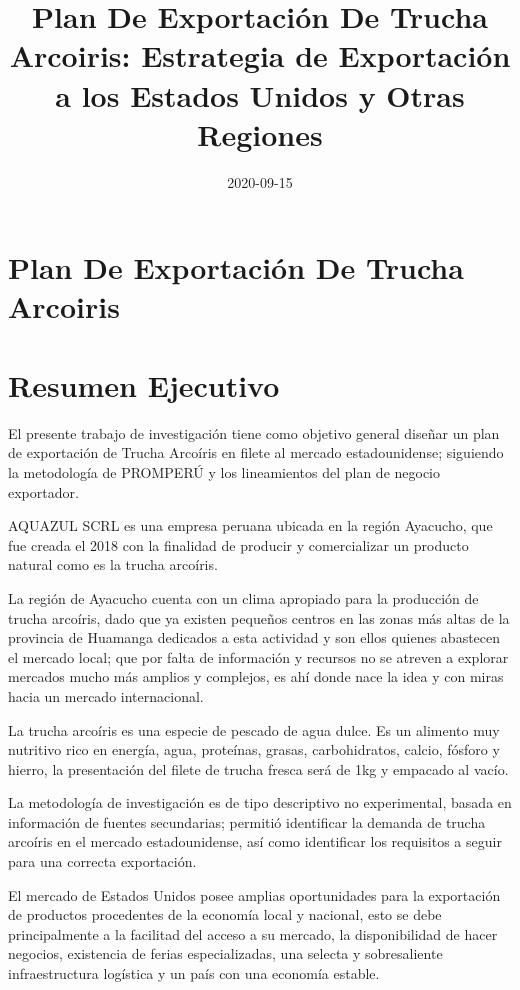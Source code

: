 \documentclass[
  stu,
  floatsintext,
  longtable,
  a4paper,
  nolmodern,
  notxfonts,
  notimes,
  colorlinks=true,linkcolor=blue,citecolor=blue,urlcolor=blue]{apa7}
\title{Plan De Exportación De Trucha Arcoiris: Estrategia de Exportación
a los Estados Unidos y Otras Regiones}
\date{2020-09-15}
\begin{document}
\maketitle

\hypertarget{toc}{}
\tableofcontents
\newpage
\section[Introduction]{Plan De Exportación De Trucha Arcoiris}

\setcounter{secnumdepth}{-\maxdimen} %

\setlength\LTleft{0pt}


\section{Resumen Ejecutivo}\label{resumen-ejecutivo}

El presente trabajo de investigación tiene como objetivo general diseñar
un plan de exportación de Trucha Arcoíris en filete al mercado
estadounidense; siguiendo la metodología de PROMPERÚ y los lineamientos
del plan de negocio exportador.

AQUAZUL SCRL es una empresa peruana ubicada en la región Ayacucho, que
fue creada el 2018 con la finalidad de producir y comercializar un
producto natural como es la trucha arcoíris.

La región de Ayacucho cuenta con un clima apropiado para la producción
de trucha arcoíris, dado que ya existen pequeños centros en las zonas
más altas de la provincia de Huamanga dedicados a esta actividad y son
ellos quienes abastecen el mercado local; que por falta de información y
recursos no se atreven a explorar mercados mucho más amplios y
complejos, es ahí donde nace la idea y con miras hacia un mercado
internacional.

La trucha arcoíris es una especie de pescado de agua dulce. Es un
alimento muy nutritivo rico en energía, agua, proteínas, grasas,
carbohidratos, calcio, fósforo y hierro, la presentación del filete de
trucha fresca será de 1kg y empacado al vacío.

La metodología de investigación es de tipo descriptivo no experimental,
basada en información de fuentes secundarias; permitió identificar la
demanda de trucha arcoíris en el mercado estadounidense, así como
identificar los requisitos a seguir para una correcta exportación.

El mercado de Estados Unidos posee amplias oportunidades para la
exportación de productos procedentes de la economía local y nacional,
esto se debe principalmente a la facilitad del acceso a su mercado, la
disponibilidad de hacer negocios, existencia de ferias especializadas,
una selecta y sobresaliente infraestructura logística y un país con una
economía estable.
\end{document}
